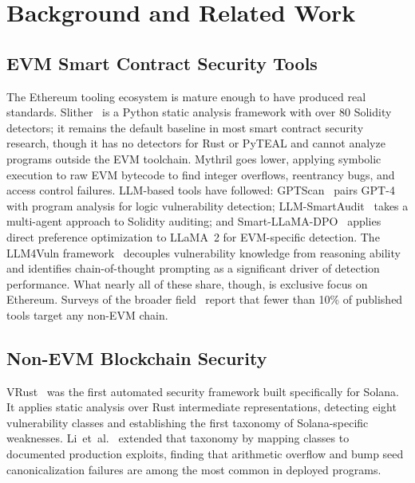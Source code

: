 \documentclass[journal]{IEEEtran}
\begin{document}
\section{Background and Related Work}
\label{sec:background}

\subsection{EVM Smart Contract Security Tools}

The Ethereum tooling ecosystem is mature enough to have produced real
standards.
Slither~\cite{feist2019slither} is a Python static analysis framework with
over 80 Solidity detectors; it remains the default baseline in most smart
contract security research, though it has no detectors for Rust or
PyTEAL and cannot analyze programs outside the EVM toolchain.
Mythril goes lower, applying symbolic execution to raw EVM bytecode to find
integer overflows, reentrancy bugs, and access control failures.
LLM-based tools have followed: GPTScan~\cite{sun2024gptscan} pairs GPT-4
with program analysis for logic vulnerability detection;
LLM-SmartAudit~\cite{wei2024llmsmartaudit} takes a multi-agent approach to
Solidity auditing; and Smart-LLaMA-DPO~\cite{yu2025smartllama} applies direct
preference optimization to LLaMA~2 for EVM-specific detection.
The LLM4Vuln framework~\cite{liu2024llm4vuln} decouples vulnerability
knowledge from reasoning ability and identifies chain-of-thought prompting as
a significant driver of detection performance.
What nearly all of these share, though, is exclusive focus on Ethereum.
Surveys of the broader field~\cite{sheng2025llmsurvey,li2025survey} report
that fewer than 10\% of published tools target any non-EVM chain.

\subsection{Non-EVM Blockchain Security}

VRust~\cite{cui2022vrust} was the first automated security framework built
specifically for Solana.
It applies static analysis over Rust intermediate representations,
detecting eight vulnerability classes and establishing the first taxonomy
of Solana-specific weaknesses.
Li~et~al.~\cite{li2025solana} extended that taxonomy by mapping classes to
documented production exploits, finding that arithmetic overflow and bump
seed canonicalization failures are among the most common in deployed programs.
\end{document}
